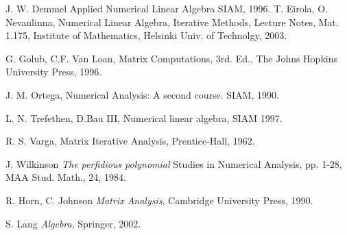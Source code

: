 \begin{thebibliography}{XXX}

 J. W. Demmel {\sc Applied Numerical Linear Algebra}
SIAM, 1996.
 T. Eirola, O. Nevanlinna, {\sc Numerical Linear Algebra, Iterative Methods}, Lecture Notes, Mat. 1.175, Institute of Mathematics, Helsinki Univ. of Technolgy, 2003.


 G. Golub, C.F. Van Loan, {\sc Matrix Computations}, 3rd. Ed., The Johns Hopkins University Press, 1996.

 J. M. Ortega,  {\sc Numerical Analysis: A second course.} SIAM, 1990.

 L. N. Trefethen, D.Bau III, {\sc Numerical linear algebra}, SIAM 1997.



 R. S. Varga, {\sc Matrix Iterative Analysis}, Prentice-Hall, 1962.

 J. Wilkinson {\it The perfidious polynomial} Studies in Numerical Analysis, pp. 1-28, MAA Stud. Math., 24, 1984.

 R. Horn, C. Johnson {\it Matrix Analysis}, Cambridge University Press, 1990.

 S. Lang {\it Algebra}, Springer, 2002.



\end{thebibliography}
